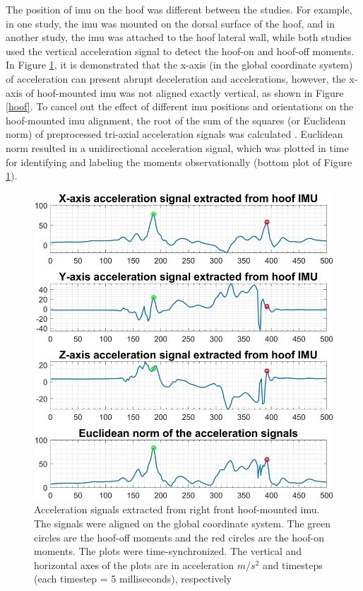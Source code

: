 The position of \gls{imu} on the hoof was different between the studies. For example, in one study, the \gls{imu} was mounted on the dorsal surface of the hoof, and in another study, the \gls{imu} was attached to the hoof lateral wall, while both studies used the vertical acceleration signal to detect the hoof-on and hoof-off moments. In Figure \ref{signals}, it is demonstrated that the x-axis (in the global coordinate system) of acceleration can present abrupt deceleration and accelerations, however, the x-axis of hoof-mounted \gls{imu} was not aligned exactly vertical, as shown in Figure \ref{hoof}. To cancel out the effect of different \gls{imu} positions and orientations on the hoof-mounted \gls{imu} alignment, the root of the sum of the squares (or Euclidean norm) of preprocessed tri-axial acceleration signals was calculated \cite{tijssen_2020_automatic,tijssen_2020_automatic_2}. Euclidean norm resulted in a unidirectional acceleration signal, which was plotted in time for identifying and labeling the moments observationally (bottom plot of Figure \ref{signals}). 
	
	\begin{figure}[tb]
\centering
\includegraphics[width=.65\linewidth]{chapters/Step/figures/signals_Step.png}
\caption{Acceleration signals extracted from right front hoof-mounted \gls{imu}. The signals were aligned on the global coordinate system. The green circles are the hoof-off moments and the red circles are the hoof-on moments. The plots were time-synchronized. The vertical and horizontal axes of the plots are in acceleration $m/s^{2}$ and timesteps (each timestep = 5 milliseconds), respectively}
\label{signals}
\end{figure}

